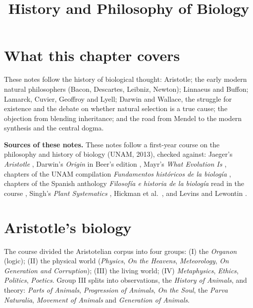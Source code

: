 



\title{History and Philosophy of Biology}
\maketitle

\label{section-phantom}

\tableofcontents

\section{What this chapter covers}
\label{section-overview}

These notes follow the history of
biological thought: Aristotle; the early
modern natural philosophers (Bacon, Descartes,
Leibniz, Newton); Linnaeus and Buffon;
Lamarck, Cuvier, Geoffroy and Lyell; Darwin
and Wallace, the struggle for existence and
the debate on whether natural selection is
a true cause; the objection from blending
inheritance; and the road from Mendel to
the modern synthesis and the central dogma.

\textbf{Sources of these notes.}
These notes follow a first-year course on
the philosophy and history of biology
(UNAM, 2013), checked against:
Jaeger's \emph{Aristotle}
\cite{jaeger1948aristotle}, Darwin's
\emph{Origin} in Beer's edition
\cite{darwin2008origin}, Mayr's \emph{What
Evolution Is} \cite{mayr2002evolution},
chapters of the UNAM compilation
\emph{Fundamentos hist\'oricos de la
biolog\'ia}
\cite{ruiz2008metodo, valor2008cartesiana,
sloan2008buffon, bueno2008lyell,
ledesma2008lamarck, zamora2008forma},
chapters of the Spanish anthology
\emph{Filosof\'ia e historia de la
biolog\'ia} read in the course
\cite{sloan-natural-history,
guillaumin-vera-causa, bowler-salida,
mayr-fisicos, gould-jenkin,
bowler-mendelismo, bowler-mendel,
barahona-biometrica, barahona-morgan,
kingsland-neodarwinismo}, Singh's
\emph{Plant Systematics}
\cite{singh2010plant}, Hickman et al.\
\cite{hickman2002animal}, and Levins and
Lewontin \cite{levins1985dialectical}.

\section{Aristotle's biology}
\label{section-aristotle}

The course divided the Aristotelian corpus
into four groups: (I) the \emph{Organon}
(logic); (II) the physical world
(\emph{Physics}, \emph{On the Heavens},
\emph{Meteorology}, \emph{On Generation and
Corruption}); (III) the living world;
(IV) \emph{Metaphysics}, \emph{Ethics},
\emph{Politics}, \emph{Poetics}. Group III
splits into observations, the
\emph{History of Animals}, and theory:
\emph{Parts of Animals}, \emph{Progression
of Animals}, \emph{On the Soul}, the
\emph{Parva Naturalia}, \emph{Movement of
Animals} and \emph{Generation of Animals}.

